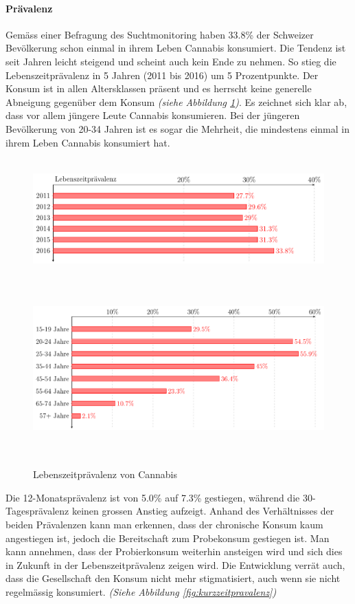 \documentclass[../main.tex]{subfiles}
\begin{document}
	\paragraph{Prävalenz}	
	Gemäss einer Befragung des Suchtmonitoring haben 33.8\% der Schweizer Bevölkerung schon einmal in ihrem Leben Cannabis konsumiert.
	Die Tendenz ist seit Jahren leicht steigend und scheint auch kein Ende zu nehmen. 
	So stieg die Lebenszeitprävalenz in 5 Jahren (2011 bis 2016) um 5 Prozentpunkte. 
	Der Konsum ist in allen Altersklassen präsent und es herrscht keine generelle Abneigung gegenüber dem Konsum \textit{(siehe Abbildung \ref{fig:langzeitpravalenz})}. 
	Es zeichnet sich klar ab, dass vor allem jüngere Leute Cannabis konsumieren. 
	Bei der jüngeren Bevölkerung von 20-34 Jahren ist es sogar die Mehrheit, die mindestens einmal in ihrem Leben Cannabis konsumiert hat.	
	
	\noindent	 
	\begin{figure}[H]
		\raggedleft
		\includegraphics[height=4.56cm]{../figures/druguse-longtime}
		\includegraphics[height=6.71cm]{../figures/druguse-longtime-age}
		\captionsetup{font=small}
		\caption[Lebenszeitprävalenz von Cannabis]{Lebenszeitprävalenz von Cannabis\protect\footnotemark}
		\label{fig:langzeitpravalenz}		
	\end{figure}%
	
	
	\noindent
	Die 12-Monatsprävalenz ist von 5.0\% auf 7.3\% gestiegen, während die 30-Tagesprävalenz keinen grossen Anstieg aufzeigt. 
	Anhand des Verhältnisses der beiden Prävalenzen kann man erkennen, dass der chronische Konsum kaum angestiegen ist, jedoch die Bereitschaft zum Probekonsum gestiegen ist. 
	Man kann annehmen, dass der Probierkonsum weiterhin ansteigen wird und sich dies in Zukunft in der Lebenszeitprävalenz zeigen wird.
	Die Entwicklung verrät auch, dass die Gesellschaft den Konsum nicht mehr stigmatisiert, auch wenn sie nicht regelmässig konsumiert.
	\textit{(Siehe Abbildung \ref{fig:kurzzeitpravalenz})}
	
\end{document}
